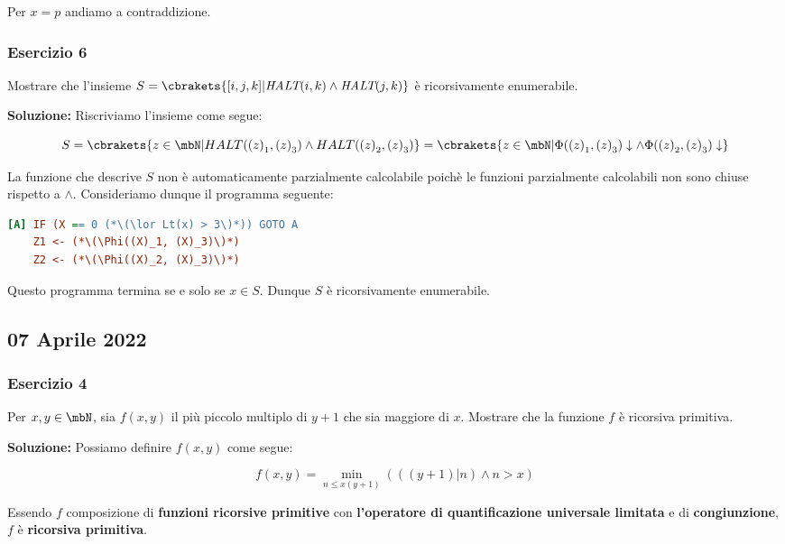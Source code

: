 Per \(x=p\) andiamo a contraddizione.

\subsubsection{Esercizio 6}

Mostrare che l'insieme \(S=\cbrakets{[i,j,k] \vert \textit{HALT}(i,k) \land \textit{HALT}(j,k)}\) è ricorsivamente enumerabile.

\textbf{Soluzione: } Riscriviamo l'insieme come segue:

\begin{equation}
  S=\cbrakets{z \in \mbN \vert HALT({(z)}_1, {(z)}_3) \land HALT({(z)}_2, {(z)}_3)}=\cbrakets{z \in \mbN \vert \Phi({(z)}_1, {(z)}_3) \downarrow \land \Phi({(z)}_2, {(z)}_3) \downarrow}
\end{equation}

La funzione che descrive \(S\) non è automaticamente parzialmente calcolabile poichè le funzioni parzialmente calcolabili non sono chiuse rispetto a \(\land\).
Consideriamo dunque il programma seguente:

\begin{lstlisting}[language=ini, caption={ }]
[A] IF (X == 0 (*\(\lor Lt(x) > 3\)*)) GOTO A
    Z1 <- (*\(\Phi((X)_1, (X)_3)\)*)
    Z2 <- (*\(\Phi((X)_2, (X)_3)\)*)
\end{lstlisting}

Questo programma termina se e solo se \(x \in S\). Dunque \(S\) è ricorsivamente enumerabile.

\subsection{07 Aprile 2022}

\subsubsection{Esercizio 4}

Per \(x,y \in \mbN\), sia \(f(x,y)\) il più piccolo multiplo di \(y+1\) che sia maggiore di \(x\). Mostrare che la funzione \(f\) è ricorsiva primitiva.

\textbf{Soluzione: } Possiamo definire \(f(x,y)\) come segue:

\begin{equation}
  f(x,y) = \min_{n\leq x(y+1)} ( ((y+1) \vert n) \land n > x)
\end{equation}

Essendo \(f\) composizione di \textbf{funzioni ricorsive primitive} con \textbf{l'operatore di quantificazione universale limitata} e di \textbf{congiunzione}, \(f\) è \textbf{ricorsiva primitiva}.

